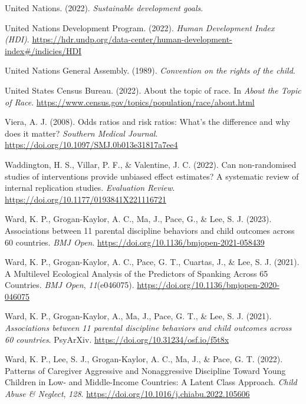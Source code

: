 \documentclass[
  letterpaper,
  DIV=11,
  numbers=noendperiod]{scrreprt}
\newlength{\cslhangindent}
\newenvironment{CSLReferences}[2] %
 {\begin{list}{}{%
  \setlength{\itemindent}{0pt}
  \setlength{\leftmargin}{0pt}
  \setlength{\parsep}{0pt}
  \ifodd #1
   \setlength{\leftmargin}{\cslhangindent}
   \setlength{\itemindent}{-1\cslhangindent}
  \fi
  \setlength{\itemsep}{#2\baselineskip}}}
 {\end{list}}
\begin{document}
\begin{CSLReferences}{1}{0}
United Nations. (2022). \emph{Sustainable development goals}.

United Nations Development Program. (2022). \emph{{Human Development
Index (HDI)}}.
\url{https://hdr.undp.org/data-center/human-development-index\#/indicies/HDI}

United Nations General Assembly. (1989). \emph{Convention on the rights
of the child}.

United States Census Bureau. (2022). About the topic of race. In
\emph{About the Topic of Race}.
\url{https://www.census.gov/topics/population/race/about.html}

Viera, A. J. (2008). Odds ratios and risk ratios: What's the difference
and why does it matter? \emph{Southern Medical Journal}.
\url{https://doi.org/10.1097/SMJ.0b013e31817a7ee4}

Waddington, H. S., Villar, P. F., \& Valentine, J. C. (2022). Can
non-randomised studies of interventions provide unbiased effect
estimates? A systematic review of internal replication studies.
\emph{Evaluation Review}.
\url{https://doi.org/10.1177/0193841X221116721}

Ward, K. P., Grogan-Kaylor, A. C., Ma, J., Pace, G., \& Lee, S. J.
(2023). Associations between 11 parental discipline behaviors and child
outcomes across 60 countries. \emph{BMJ Open}.
\url{https://doi.org/10.1136/bmjopen-2021-058439}

Ward, K. P., Grogan-Kaylor, A. C., Pace, G. T., Cuartas, J., \& Lee, S.
J. (2021). {A Multilevel Ecological Analysis of the Predictors of
Spanking Across 65 Countries}. \emph{BMJ Open}, \emph{11}(e046075).
\url{https://doi.org/10.1136/bmjopen-2020-046075}

Ward, K. P., Grogan-Kaylor, A., Ma, J., Pace, G. T., \& Lee, S. J.
(2021). \emph{Associations between 11 parental discipline behaviors and
child outcomes across 60 countries}. PsyArXiv.
\url{https://doi.org/10.31234/osf.io/f5t8x}

Ward, K. P., Lee, S. J., Grogan-Kaylor, A. C., Ma, J., \& Pace, G. T.
(2022). {Patterns of Caregiver Aggressive and Nonaggressive Discipline
Toward Young Children in Low- and Middle-Income Countries: A Latent
Class Approach}. \emph{Child Abuse \& Neglect}, \emph{128}.
\url{https://doi.org/10.1016/j.chiabu.2022.105606}


\end{CSLReferences}
\end{document}
